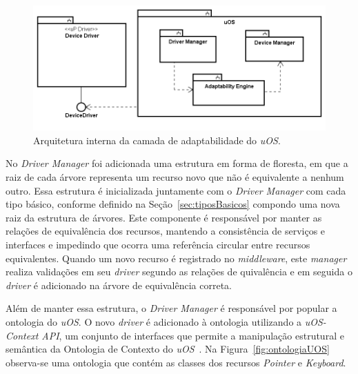 \begin{figure}[ht]
	\center
	\includegraphics[scale=0.6]{imagens/diagramaDeBlocos}
	\caption{Arquitetura interna da camada de adaptabilidade do \emph{uOS}.}
	\label{fig:diagramaDeBlocos}
\end{figure}

No \emph{Driver Manager} foi adicionada uma estrutura em forma de floresta, em que a raiz de cada árvore representa um recurso novo que não é equivalente a nenhum outro. Essa estrutura é inicializada juntamente com o \emph{Driver Manager} com cada tipo básico, conforme definido na Seção~\ref{sec:tiposBasicos} compondo uma nova raiz da estrutura de árvores. Este componente é responsável por manter as relações de equivalência dos recursos, mantendo a consistência de serviços e interfaces e impedindo que ocorra uma referência circular entre recursos equivalentes. Quando um novo recurso é registrado no \emph{middleware}, este \emph{manager} realiza validações em seu \emph{driver} segundo as relações de quivalência e em seguida o \emph{driver} é adicionado na árvore de equivalência correta. 

Além de manter essa estrutura, o \emph{Driver Manager} é responsável por popular a ontologia do \emph{uOS}. O novo \emph{driver} é adicionado à ontologia utilizando a \emph{uOS-Context API}, um conjunto de interfaces que permite a manipulação estrutural e semântica da Ontologia de Contexto do \emph{uOS}~\cite{ozakisbcup2011}. Na Figura~\ref{fig:ontologiaUOS} observa-se uma ontologia que contém as classes dos recursos \emph{Pointer} e \emph{Keyboard}.

